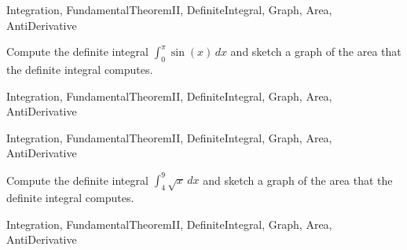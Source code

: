 \begin{tagblock}{Integration, FundamentalTheoremII, DefiniteIntegral, Graph, Area, AntiDerivative }
\begin{question}

Compute the definite integral $\displaystyle \int_0^\pi \sin(x) \, dx$ and sketch a graph of the area that the definite integral computes.


	
	
\begin{tags}
	   Integration, FundamentalTheoremII, DefiniteIntegral, Graph, Area, AntiDerivative
\end{tags}
	
\begin{diary}
\end{diary}
	
\begin{solution}
	   
	    \end{enumerate}
\end{solution}
	
\end{question}

\end{tagblock}

\begin{tagblock}{Integration, FundamentalTheoremII, DefiniteIntegral, Graph, Area, AntiDerivative }
\begin{question}

Compute the definite integral $\displaystyle \int_4^9 \sqrt{x} \, dx$ and sketch a graph of the area that the definite integral computes.


	
	
\begin{tags}
	   Integration, FundamentalTheoremII, DefiniteIntegral, Graph, Area, AntiDerivative
\end{tags}
	
\begin{diary}
	   
\end{diary}
	
\begin{solution}
	   
	    \end{enumerate}
\end{solution}
	
\end{question}

\end{tagblock}

